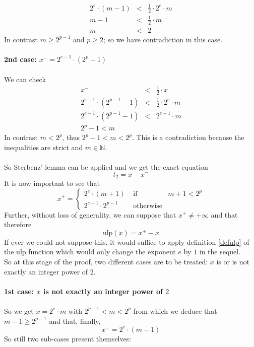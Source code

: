 \documentclass[a4paper,10pt,twoside]{article}
\newenvironment{proof}[1][Proof]{\begin{trivlist}
\item[\hskip \labelsep {\bfseries #1}]}{\end{trivlist}}
\newcommand{\N}{\ensuremath{\mathbb {N}}}
\newcommand{\mUlp}{\ensuremath{\mathrm{ulp}}}
\begin{document}
\begin{proof}
\begin{eqnarray*}
2^e \cdot \left( m - 1 \right) & < & \frac{1}{2} \cdot 2^e \cdot m \\
m-1 & < & \frac{1}{2} \cdot m \\
m & < & 2 
\end{eqnarray*}
In contrast $m \geq 2^{p-1}$ and $p\geq2$; so we have contradiction in this case. \\ ~ \\
{\bf 2nd case: $x^- = 2^{e-1} \cdot  \left( 2^p -1 \right)$ } \\ ~ \\
We can check 
\begin{eqnarray*}
x^- & < & \frac{1}{2} \cdot x \\
2^{e-1} \cdot \left( 2^{p-1} - 1 \right) & < & \frac{1}{2} \cdot 2^e \cdot m \\
2^{e-1} \cdot \left( 2^{p-1} - 1 \right) & < & 2^{e-1} \cdot m \\
2^p - 1 < m
\end{eqnarray*}
In contrast $m<2^p$, thus $2^p - 1 < m < 2^p$.
This is a contradiction because the inequalities are strict and $m \in \N$. \\ ~ \\
So Sterbenz' lemma \cite{Ste74} can be applied and we get the exact equation
$$t_2 = x - x^-$$
It is now important to see that 
$$x^+ = \left \lbrace \begin{array}{lll} 2^e \cdot \left(m + 1 \right) & \mbox{ if } & m+1 < 2^p \\
                                             2^{e+1} \cdot 2^{p-1} & \mbox{ otherwise} & \end{array} \right.$$
Further, without loss of generality, we can suppose that $x^+ \not = + \infty$ and that therefore
$$\mUlp \left( x \right) = x^+ - x$$
If ever we could not suppose this, it would suffice to apply definition \ref{defulp} of the 
$\mUlp$ function which would only change the exponent $e$ by $1$ in the sequel.\\
So at this stage of the proof, two different cases are to be treated: 
$x$ is or is not exactly an integer power of $2$. \\ ~ \\
{\bf 1st case: $x$ is not exactly an integer power of $2$ } \\ ~ \\
So we get $x=2^e \cdot m$ with $2^{p-1} < m < 2^p$ from which we deduce that $m-1 \geq 2^{p-1}$ and that, finally,
$$x^- = 2^e \cdot \left(m - 1 \right)$$
So still two sub-cases present themselves: \\ ~ \\

\end{proof}
\end{document}

